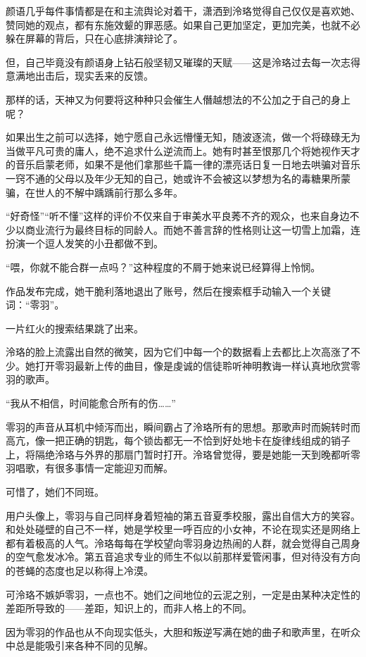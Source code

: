 \documentclass[UTF8, scheme = chinese, openany]{ctexbook}
\begin{document}
颜语几乎每件事情都是在和主流舆论对着干，潇洒到泠珞觉得自己仅仅是喜欢她、赞同她的观点，都有东施效颦的罪恶感。如果自己更加坚定，更加完美，也就不必躲在屏幕的背后，只在心底排演辩论了。

但，自己毕竟没有颜语身上钻石般坚韧又璀璨的天赋——这是泠珞过去每一次志得意满地出击后，现实丢来的反馈。

那样的话，天神又为何要将这种种只会催生人僭越想法的不公加之于自己的身上呢？

如果出生之前可以选择，她宁愿自己永远懵懂无知，随波逐流，做一个将碌碌无为当做平凡可贵的庸人，绝不追求什么逆流而上。她有时甚至恨那几个将她视作天才的音乐启蒙老师，如果不是他们拿那些千篇一律的漂亮话日复一日地去哄骗对音乐一窍不通的父母以及年少无知的自己，她或许不会被这以梦想为名的毒糖果所蒙骗，在世人的不解中踽踽前行那么多年。

“好奇怪”“听不懂”这样的评价不仅来自于审美水平良莠不齐的观众，也来自身边不少以商业流行为最终目标的同龄人。而她不善言辞的性格则让这一切雪上加霜，连扮演一个逗人发笑的小丑都做不到。

“喂，你就不能合群一点吗？”这种程度的不屑于她来说已经算得上怜悯。

作品发布完成，她干脆利落地退出了账号，然后在搜索框手动输入一个关键词：“零羽”。

一片红火的搜索结果跳了出来。

泠珞的脸上流露出自然的微笑，因为它们中每一个的数据看上去都比上次高涨了不少。她打开零羽最新上传的曲目，像是虔诚的信徒聆听神明教诲一样认真地欣赏零羽的歌声。

“我从不相信，时间能愈合所有的伤……”

零羽的声音从耳机中倾泻而出，瞬间霸占了泠珞所有的思想。那歌声时而婉转时而高亢，像一把正确的钥匙，每个锁齿都无一不恰到好处地卡在旋律线组成的销子上，将隔绝泠珞与外界的那扇门暂时打开。泠珞曾觉得，要是她能一天到晚都听零羽唱歌，有很多事情一定能迎刃而解。

可惜了，她们不同班。

用户头像上，零羽与自己同样身着短袖的第五音夏季校服，露出自信大方的笑容。和处处碰壁的自己不一样，她是学校里一呼百应的小女神，不论在现实还是网络上都有着极高的人气。泠珞每每在学校望向零羽身边热闹的人群，就会觉得自己周身的空气愈发冰冷。第五音追求专业的师生不似以前那样爱管闲事，但对待没有方向的苍蝇的态度也足以称得上冷漠。

可泠珞不嫉妒零羽，一点也不。她们之间地位的云泥之别，一定是由某种决定性的差距所导致的——差距，知识上的，而非人格上的不同。

因为零羽的作品也从不向现实低头，大胆和叛逆写满在她的曲子和歌声里，在听众中总是能吸引来各种不同的见解。
\end{document}
